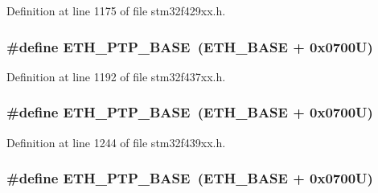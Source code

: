 Definition at line 1175 of file stm32f429xx.\+h.

\subsubsection[{\texorpdfstring{E\+T\+H\+\_\+\+P\+T\+P\+\_\+\+B\+A\+SE}{ETH_PTP_BASE}}]{\setlength{\rightskip}{0pt plus 5cm}\#define E\+T\+H\+\_\+\+P\+T\+P\+\_\+\+B\+A\+SE~({\bf E\+T\+H\+\_\+\+B\+A\+SE} + 0x0700\+U)}\hypertarget{group___peripheral__memory__map_gaa0f60b922aeb7275c785cbaa8f94ecf0}{}\label{group___peripheral__memory__map_gaa0f60b922aeb7275c785cbaa8f94ecf0}


Definition at line 1192 of file stm32f437xx.\+h.

\subsubsection[{\texorpdfstring{E\+T\+H\+\_\+\+P\+T\+P\+\_\+\+B\+A\+SE}{ETH_PTP_BASE}}]{\setlength{\rightskip}{0pt plus 5cm}\#define E\+T\+H\+\_\+\+P\+T\+P\+\_\+\+B\+A\+SE~({\bf E\+T\+H\+\_\+\+B\+A\+SE} + 0x0700\+U)}\hypertarget{group___peripheral__memory__map_gaa0f60b922aeb7275c785cbaa8f94ecf0}{}\label{group___peripheral__memory__map_gaa0f60b922aeb7275c785cbaa8f94ecf0}


Definition at line 1244 of file stm32f439xx.\+h.

\subsubsection[{\texorpdfstring{E\+T\+H\+\_\+\+P\+T\+P\+\_\+\+B\+A\+SE}{ETH_PTP_BASE}}]{\setlength{\rightskip}{0pt plus 5cm}\#define E\+T\+H\+\_\+\+P\+T\+P\+\_\+\+B\+A\+SE~({\bf E\+T\+H\+\_\+\+B\+A\+SE} + 0x0700\+U)}\hypertarget{group___peripheral__memory__map_gaa0f60b922aeb7275c785cbaa8f94ecf0}{}\label{group___peripheral__memory__map_gaa0f60b922aeb7275c785cbaa8f94ecf0}


